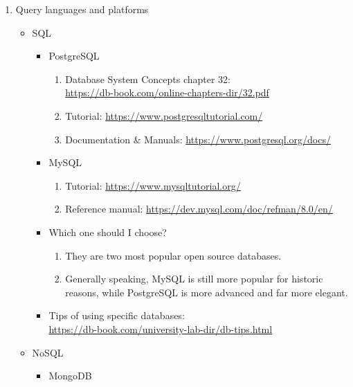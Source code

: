 \documentclass{article}
\begin{document}
\begin{enumerate}
    \item Query languages and platforms
    \begin{itemize}
        \item SQL
        \begin{itemize}
            \item PostgreSQL
            \begin{enumerate}
                \item Database System Concepts chapter 32:\\
                \href{https://db-book.com/online-chapters-dir/32.pdf}{https://db-book.com/online-chapters-dir/32.pdf}
                \item Tutorial:
                \href{https://www.postgresqltutorial.com/}{https://www.postgresqltutorial.com/}
                \item Documentation \& Manuals:
                \href{https://www.postgresql.org/docs/}{https://www.postgresql.org/docs/}
            \end{enumerate}     
            \item MySQL
            \begin{enumerate}
                \item Tutorial:
                \href{https://www.mysqltutorial.org/}{https://www.mysqltutorial.org/}
                \item Reference manual:
                \href{https://dev.mysql.com/doc/refman/8.0/en/}{https://dev.mysql.com/doc/refman/8.0/en/}
            \end{enumerate}
            \item Which one should I choose?
            \begin{enumerate}
                \item They are two most popular open source databases.
                \item Generally speaking, MySQL is still more popular for historic reasons, while PostgreSQL is more advanced and far more elegant.
            \end{enumerate}
            \item Tips of using specific databases:\\
            \href{https://db-book.com/university-lab-dir/db-tips.html}{https://db-book.com/university-lab-dir/db-tips.html}
        \end{itemize}
        \item NoSQL
        \begin{itemize}
            \item MongoDB

\end{itemize}
\end{itemize}
\end{enumerate}
\end{document}
